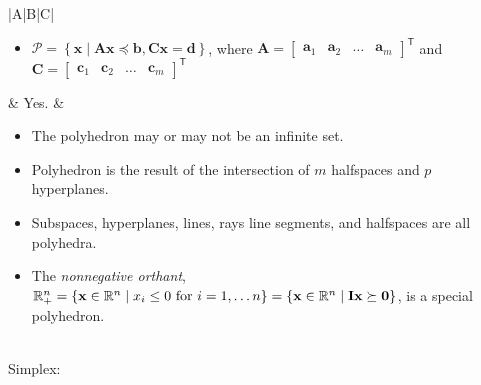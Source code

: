 \documentclass{article}
\newcommand{\trans}{\mathsf{T}}
\begin{document}
\begin{table}[ht!]
\begin{tabularx}{\textwidth}{|A|B|C|}
\begin{itemize}[leftmargin=*]
    \item \(\mathcal{P} = \left\{ \mathbf{x} \mid \mathbf{Ax} \preceq \mathbf{b}, \mathbf{Cx} = \mathbf{d} \right\}\), where \(\mathbf{A} = \begin{bmatrix}
            \mathbf{a}_1 & \mathbf{a}_2 & \dots & \mathbf{a}_m
        \end{bmatrix}^\trans\) and \(\mathbf{C} = \begin{bmatrix}
            \mathbf{c}_1 & \mathbf{c}_2 & \dots & \mathbf{c}_m
        \end{bmatrix}^\trans\)
\end{itemize} & Yes. & \vspace{-3.5ex}
\begin{itemize}[leftmargin=*]
    \item The polyhedron may or may not be an infinite set.
    \item Polyhedron is the result of the intersection of \(m\) halfspaces and \(p\) hyperplanes.
    \item Subspaces, hyperplanes, lines, rays line segments, and
    halfspaces are all polyhedra.
    \item The \emph{nonnegative orthant}, \(\mathbb{R}_{+}^{n} = \left\{ \mathbf{x} \in \mathbb{R}^n \mid x_i \leq 0 \textnormal{ for } i=1,\dots n \right\} = \left\{ \mathbf{x} \in \mathbb{R}^n \mid \mathbf{Ix}  \succeq \mathbf{0}\right\}\), is a special polyhedron.
\end{itemize}\\
\hline
Simplex:
\end{tabularx}
\end{table}
\end{document}
